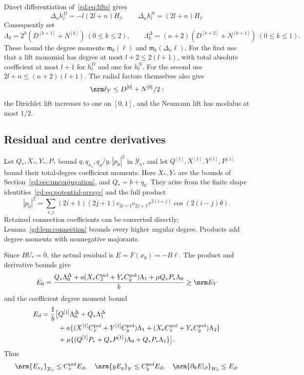 Direct differentiation of~\eqref{gd:eq:lifts} gives
\[
 \Delta_n h_l^D=-l(2l+n)H_l,\qquad
 \Delta_n h_l^N=(2l+n)H_l .
\]
Consequently set
\begin{equation}\label{gd:eq:lift-moments}
 \Lambda_k=2^k(D^{[k+1]}+N^{[k]})\ (0\le k\le2),\qquad
 \Lambda^\Delta_k=(n+2)(D^{[k+2]}+N^{[k+1]})\ (0\le k\le1).
\end{equation}
These bound the degree moments $\mathfrak m_k(\ell)$ and
$\mathfrak m_k(\Delta_n\ell)$.
For the first use that a lift monomial has degree at most
$l+2\le2(l+1)$, with total absolute coefficient at most $l+1$
for $h_l^D$ and one for $h_l^N$.
For the second use $2l+n\le(n+2)(l+1)$.
The radial factors themselves also give
\[
 \nrm\ell_Y\le D^{[0]}+N^{[0]}/2:
\]
the Dirichlet lift increases to one on $[0,1]$, and the Neumann
lift has modulus at most $1/2$.

\subsection{Residual and centre derivatives}\label{gd:sec:residual}
Let $Q_*,X_*,Y_*,P_*$ bound $q,q_{x_1},q_y/y,|p_0|^2$
in $\mathcal Y_n$, and let $Q^{[1]},X^{[1]},Y^{[1]},P^{[1]}$ bound their
total-degree coefficient moments.
Here $X_*,Y_*$ are the bounds of Section~\ref{gd:sec:unconjugation},
and $Q_*=b+q_b$. They arise from the finite shape identities~\eqref{gd:eq:potential-arrays}
and the full product
\[
 |p_0|^2=\sum_{i,j}(2i+1)(2j+1)c_{2i+1}c_{2j+1}
                         r^{2(i+j)}\cos(2(i-j)\theta).
\]
Retained connection coefficients can be converted directly;
Lemma~\ref{gd:lem:connection} bounds every higher angular degree.
Products add degree moments with nonnegative majorants.

Since $BU_*=0$, the actual residual is $E=F(x_0)=-B\ell$.
The product and derivative bounds give
\begin{equation}\label{gd:eq:E0}
 E_0=\frac{Q_*\Lambda^\Delta_0+
       a(X_*C_x^{\rm pol}+Y_*C_y^{\rm pol})\Lambda_1+\mu Q_*P_*\Lambda_0}{b}
       \ge\nrm E_Y
\end{equation}
and the coefficient degree moment bound
\begin{equation}\label{gd:eq:Ed}
 \begin{split}
 E_d=\frac1b\bigl[&
 Q^{[1]}\Lambda^\Delta_0+Q_*\Lambda^\Delta_1\\
 &+a\{(X^{[1]}C_x^{\rm pol}+Y^{[1]}C_y^{\rm pol})\Lambda_1
       +(X_*C_x^{\rm pol}+Y_*C_y^{\rm pol})\Lambda_2\}\\
 &+\mu\{(Q^{[1]}P_*+Q_*P^{[1]})\Lambda_0+Q_*P_*\Lambda_1\}\bigr].
 \end{split}
\end{equation}
Thus
\[
 \nrm{E_{x_1}}_{\mathcal Y_n}\le C_x^{\rm pol}E_d,\quad
 \nrm{yE_y}_Y\le C_y^{\rm pol}E_d,\quad
 \nrm{\partial_\theta E|_\partial}_{W_0}\le E_d .
\]

